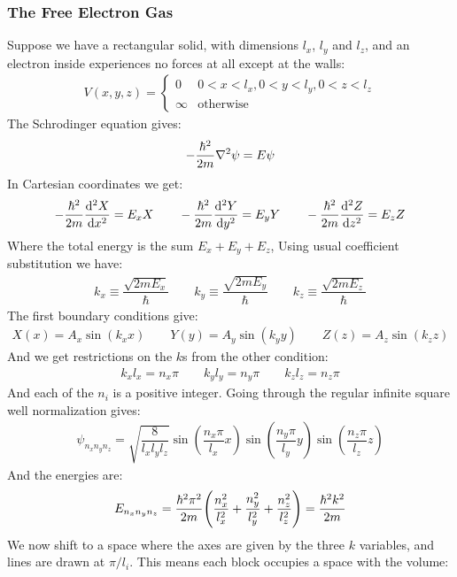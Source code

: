 \subsubsection{The Free Electron Gas}
Suppose we have a rectangular solid, with dimensions $l_x$, $l_y$ and $l_z$, and an electron inside experiences no forces at all except at the walls:
\begin{align*}
  V(x,y,z)=
  \begin{cases}
    0 & 0<x<l_x,0<y<l_y,0<z<l_z\\
    \infty & \text{otherwise}
  \end{cases}
\end{align*}
The Schrodinger equation gives:
\begin{align*}
  -\dfrac{\hbar^2}{2m}\laplacian{\psi}=E\psi
\end{align*}
In Cartesian coordinates we get:
\begin{align*}
  -\dfrac{\hbar^2}{2m}\dv[2]{X}{x}=E_xX\qquad
  -\dfrac{\hbar^2}{2m}\dv[2]{Y}{y}=E_yY\qquad
  -\dfrac{\hbar^2}{2m}\dv[2]{Z}{z}=E_zZ
\end{align*}
Where the total energy is the sum $E_x+E_y+E_z$, Using usual coefficient substitution we have:
\begin{align*}
  k_x\equiv\dfrac{\sqrt{2mE_x}}{\hbar}\qquad
  k_y\equiv\dfrac{\sqrt{2mE_y}}{\hbar}\qquad
  k_z\equiv\dfrac{\sqrt{2mE_z}}{\hbar}
\end{align*}
The first boundary conditions give:
\begin{align*}
  X(x)=A_x\sin(k_xx)\qquad Y(y)=A_y\sin(k_yy)\qquad Z(z)=A_z\sin(k_zz)
\end{align*}
And we get restrictions on the $k$s from the other condition:
\begin{align*}
  k_xl_x=n_x\pi\qquad k_yl_y=n_y\pi\qquad k_zl_z=n_z\pi
\end{align*}
And each of the $n_i$ is a positive integer. Going through the regular infinite square well normalization gives:
\begin{align*}
  \psi_{n_xn_yn_z}=\sqrt{\dfrac{8}{l_xl_yl_z}}
  \sin(\dfrac{n_x\pi}{l_x}x)\sin(\dfrac{n_y\pi}{l_y}y)\sin(\dfrac{n_z\pi}{l_z}z)
\end{align*}
And the energies are:
\begin{align*}
  E_{n_xn_yn_z}=\dfrac{\hbar^2\pi^2}{2m}
  \qty(\dfrac{n_x^2}{l_x^2}+\dfrac{n_y^2}{l_y^2}+\dfrac{n_z^2}{l_z^2})=
  \dfrac{\hbar^2k^2}{2m}
\end{align*}
We now shift to a space where the axes are given by the three $k$ variables, and lines are drawn at $\pi/l_i$. This means each block occupies a space with the volume:
